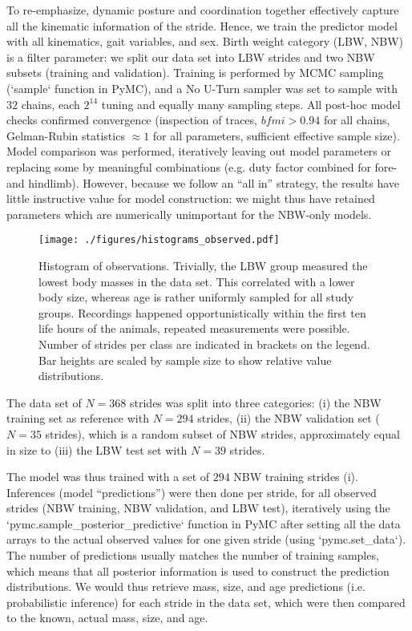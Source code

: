 \documentclass[10pt,a4paper]{article}
\begin{document}
To re-emphasize, dynamic posture and coordination together effectively capture all the kinematic information of the stride.
Hence, we train the predictor model with all kinematics, gait variables, and sex.
Birth weight category (LBW, NBW) is a filter parameter: we split our data set into LBW strides and two NBW subsets (training and validation).
Training is performed by MCMC sampling (`sample` function in PyMC), and a No U-Turn sampler was set to sample with \(32\) chains, each \(2^{14}\) tuning and equally many sampling steps.
All post-hoc model checks confirmed convergence (inspection of traces, \(bfmi>0.94\) for all chains, Gelman-Rubin statistics \(\approx 1\) for all parameters, sufficient effective sample size).
Model comparison was performed, iteratively leaving out model parameters or replacing some by meaningful combinations (e.g. duty factor combined for fore- and hindlimb).
However, because we follow an ``all in'' strategy, the results have little instructive value for model construction: we might thus have retained parameters which are numerically unimportant for the NBW-only models.



\begin{figure}[t]
\centering
\texttt{[image: ./figures/histograms\_observed.pdf]}
\caption{\label{fig:observations}Histogram of observations. Trivially, the LBW group measured the lowest body masses in the data set. This correlated with a lower body size, whereas age is rather uniformly sampled for all study groups. Recordings happened opportunistically within the first ten life hours of the animals, repeated measurements were possible. Number of strides per class are indicated in brackets on the legend. Bar heights are scaled by sample size to show relative value distributions.}
\end{figure}


The data set of
\(N = 368\) strides was split into three categories:
(i) the NBW training set as reference with
\(N = 294\) strides,
(ii) the NBW validation set (
\(N = 35\) strides), which is a random subset of NBW strides, approximately equal in size to
(iii) the LBW test set with
\(N = 39\) strides.

The model was thus trained with a set of \(294\) NBW training strides (i).
Inferences (model ``predictions'') were then done per stride, for all observed strides (NBW training, NBW validation, and LBW test), iteratively using the `pymc.sample\_posterior\_predictive` function in PyMC after setting all the data arrays to the actual observed values for one given stride (using `pymc.set\_data`).
The number of predictions usually matches the number of training samples, which means that all posterior information is used to construct the prediction distributions.
We would thus retrieve mass, size, and age predictions (i.e. probabilistic inference) for each stride in the data set, which were then compared to the known, actual mass, size, and age.
\end{document}
